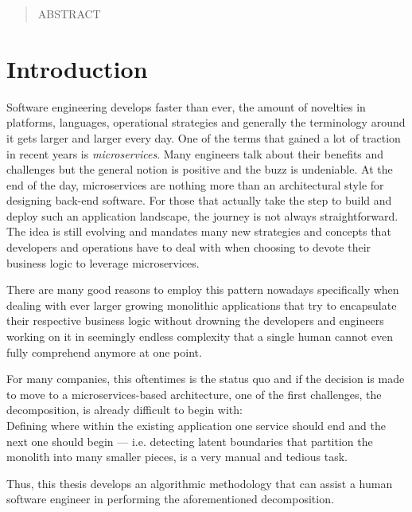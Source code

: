 \documentclass[12pt,a4paper]{report}
\begin{document}




\begin{abstract}

ABSTRACT

\end{abstract}



\tableofcontents



\chapter{Introduction} \label{chap:introduction}

Software engineering develops faster than ever, the amount of novelties in
platforms, languages, operational strategies and generally the terminology
around it gets larger and larger every day.
One of the terms that gained a lot of traction in recent years is \textit{microservices}.
Many engineers talk about their benefits and challenges but the general notion
is positive and the buzz is undeniable.
At the end of the day, microservices are nothing more than an architectural style
for designing back-end software.
For those that actually take the step to build and deploy such an application
landscape, the journey is not always straightforward.
The idea is still evolving and mandates many new strategies and concepts
that developers and operations have to deal with
when choosing to devote their business logic to leverage microservices.

There are many good reasons to employ this pattern nowadays specifically
when dealing with ever larger growing monolithic applications that try to
encapsulate their respective business logic without drowning the
developers and engineers working on it in seemingly endless complexity
that a single human cannot even fully comprehend anymore at one point.

For many companies, this oftentimes is the status quo and if the decision is
made to move to a microservices-based architecture, one of the first
challenges, the decomposition, is already difficult to begin with:\\
Defining where within the existing application one service should end and the
next one should begin --- i.e. detecting latent boundaries that partition
the monolith into many smaller pieces, is a very manual and tedious task.

Thus, this thesis develops an algorithmic methodology that can assist
a human software engineer in performing the aforementioned decomposition.
\end{document}

